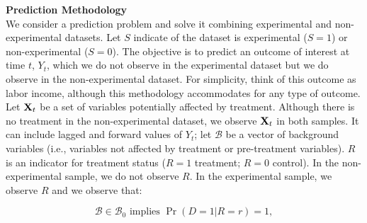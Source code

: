 






\noindent \textbf{Prediction Methodology} \\

\noindent We consider a prediction problem and solve it combining experimental and non-experimental datasets. Let $S$ indicate of the dataset is experimental ($S=1$) or non-experimental ($S=0$). The objective is to predict an outcome of interest at time $t$, $Y_{t}$, which we do not observe in the experimental dataset but we do observe in the non-experimental dataset. For simplicity, think of this outcome as labor income, although this methodology accommodates for any type of outcome.\\

\noindent Let $\bold{X}_{t}$ be a set of variables potentially affected by treatment. Although there is no treatment in the non-experimental dataset, we observe $\bold{X}_{t}$ in both samples. It can include lagged and forward values of $Y_{t}$; let $\mathcal{B}$ be a vector of background variables (i.e., variables not affected by treatment or pre-treatment variables). $R$ is an indicator for treatment status ($R = 1$ treatment; $R = 0$ control). In the non-experimental sample, we do not observe $R$. In the experimental sample, we observe $R$ and we observe that: 

\begin{equation}
\mathcal{B} \in \mathcal{B}_{0} \text{ implies } \Pr \left( D = 1 | R = r \right) = 1, 
\end{equation}

\noindent 



\noindent 


\singlespace



 